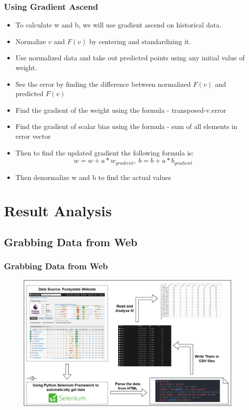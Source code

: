 \documentclass{beamer}
\begin{document}
% 
% 
% 
% 
\begin{frame}
  \frametitle{Using Gradient Ascend}
  \begin{itemize}
    \item To calculate w and b, we will use gradient ascend on historical data.
    \item Normalize $v$ and $F(v)$ by centering and standardizing it.
    \item Use normalized data and take out predicted points using any initial value of weight.
    \item See the error by finding the difference between normalized $F(v)$ and predicted $F(v)$
    \item Find the gradient of the weight using the formula - transposed-v.error
    \item Find the gradient of scalar bias using the formula - sum of all elements in error vector
    \item Then to find the updated gradient the following formula is:
    $$ w = w + a*w_{gradient}, \ b = b + a*b_{gradient} $$
    \item Then denormalize w and b to find the actual values
    
  \end{itemize}
\end{frame}
% 
% 
% 
% 
\section{Result Analysis}
\subsection{Grabbing Data from Web}
\begin{frame}
  \frametitle{Grabbing Data from Web}
  \begin{figure}
    \includegraphics[width=\textwidth]{img/DataGrab.png}
  \end{figure}
\end{frame}
\end{document}
